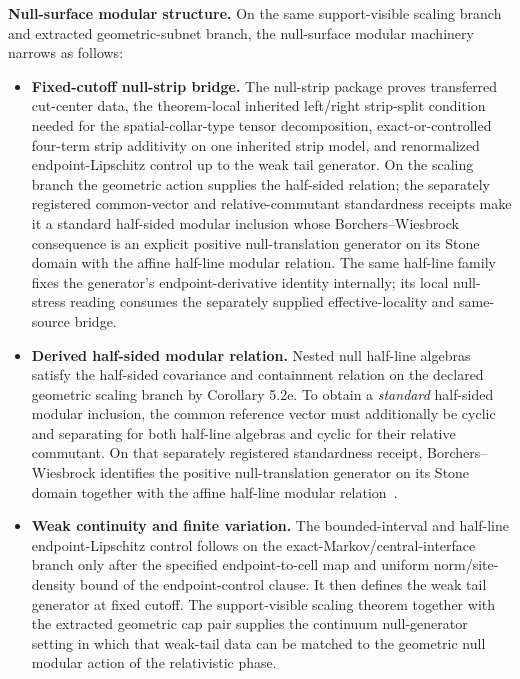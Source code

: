 \textbf{Null-surface modular structure.} On the same support-visible scaling branch and extracted geometric-subnet branch, the null-surface modular machinery narrows as follows:
\begin{itemize}
\item
\textbf{Fixed-cutoff null-strip bridge.} The null-strip package proves transferred cut-center data, the theorem-local inherited left/right strip-split condition needed for the spatial-collar-type tensor decomposition, exact-or-controlled four-term strip additivity on one inherited strip model, and renormalized endpoint-Lipschitz control up to the weak tail generator.  On the scaling branch the geometric action supplies the half-sided relation; the separately registered common-vector and relative-commutant standardness receipts make it a standard half-sided modular inclusion whose Borchers--Wiesbrock consequence is an explicit positive null-translation generator on its Stone domain with the affine half-line modular relation. The same half-line family fixes the generator's endpoint-derivative identity internally; its local null-stress reading consumes the separately supplied effective-locality and same-source bridge.
\item
\textbf{Derived half-sided modular relation.} Nested null half-line algebras satisfy the half-sided covariance and containment relation on the declared geometric scaling branch by Corollary 5.2e.  To obtain a \emph{standard} half-sided modular inclusion, the common reference vector must additionally be cyclic and separating for both half-line algebras and cyclic for their relative commutant.  On that separately registered standardness receipt, Borchers--Wiesbrock identifies the positive null-translation generator on its Stone domain together with the affine half-line modular relation~\cite{wiesbrock93}.
\item
\textbf{Weak continuity and finite variation.} The bounded-interval and half-line endpoint-Lipschitz control follows on the exact-Markov/central-interface branch only after the specified endpoint-to-cell map and uniform norm/site-density bound of the endpoint-control clause. It then defines the weak tail generator at fixed cutoff. The support-visible scaling theorem together with the extracted geometric cap pair supplies the continuum null-generator setting in which that weak-tail data can be matched to the geometric null modular action of the relativistic phase.
\end{itemize}

